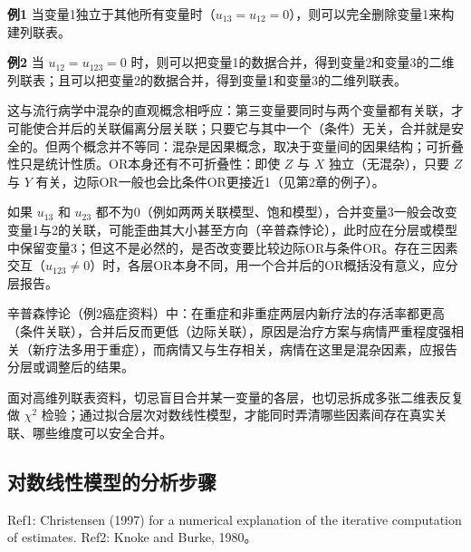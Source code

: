 \textbf{例1} 当变量1独立于其他所有变量时（$u_{13}=u_{12}=0$），则可以完全删除变量1来构建列联表。

\textbf{例2} 当 $u_{12}=u_{123}=0$ 时，则可以把变量1的数据合并，得到变量2和变量3的二维列联表；且可以把变量2的数据合并，得到变量1和变量3的二维列联表。
\begin{annotation}这与流行病学中混杂的直观概念相呼应：第三变量要同时与两个变量都有关联，才可能使合并后的关联偏离分层关联；只要它与其中一个（条件）无关，合并就是安全的。但两个概念并不等同：混杂是因果概念，取决于变量间的因果结构；可折叠性只是统计性质。OR本身还有不可折叠性：即使 $Z$ 与 $X$ 独立（无混杂），只要 $Z$ 与 $Y$ 有关，边际OR一般也会比条件OR更接近1（见第2章的例子）。\end{annotation}
如果 $u_{13}$ 和 $u_{23}$ 都不为0（例如两两关联模型、饱和模型），合并变量3一般会改变变量1与2的关联，可能歪曲其大小甚至方向（辛普森悖论），此时应在分层或模型中保留变量3；但这不是必然的，是否改变要比较边际OR与条件OR。存在三因素交互（$u_{123}\ne0$）时，各层OR本身不同，用一个合并后的OR概括没有意义，应分层报告。
\begin{annotation}辛普森悖论（例2癌症资料）中：在重症和非重症两层内新疗法的存活率都更高（条件关联），合并后反而更低（边际关联），原因是治疗方案与病情严重程度强相关（新疗法多用于重症），而病情又与生存相关，病情在这里是混杂因素，应报告分层或调整后的结果。\end{annotation}
面对高维列联表资料，切忌盲目合并某一变量的各层，也切忌拆成多张二维表反复做 $\chi^2$ 检验；通过拟合层次对数线性模型，才能同时弄清哪些因素间存在真实关联、哪些维度可以安全合并。
\subsection{对数线性模型的分析步骤}
Ref1: Christensen (1997) for a numerical explanation of the iterative computation of estimates. Ref2: Knoke and Burke, 1980。

